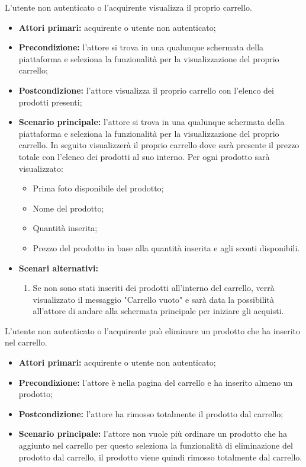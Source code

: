 L'utente non autenticato o l'acquirente visualizza il proprio carrello.
\begin{itemize}
    \item \textbf{Attori primari:} acquirente o utente non autenticato;
    \item \textbf{Precondizione:} l'attore si trova in una qualunque schermata della piattaforma e seleziona la funzionalità per la visualizzazione del proprio carrello;
    \item \textbf{Postcondizione:} l'attore visualizza il proprio carrello con l'elenco dei prodotti presenti;
    \item \textbf{Scenario principale:} l'attore si trova in una qualunque schermata della piattaforma e seleziona la funzionalità per la visualizzazione del proprio carrello. In seguito visualizzerà il proprio carrello dove sarà presente il prezzo totale con l'elenco dei prodotti al suo interno. Per ogni prodotto sarà visualizzato:
    \begin{itemize}
        \item Prima foto disponibile del prodotto;
        \item Nome del prodotto;
        \item Quantità inserita;
        \item Prezzo del prodotto in base alla quantità inserita e agli sconti disponibili.
    \end{itemize}
    \item \textbf{Scenari alternativi:} 
    \begin{enumerate}[label=\lett]
        \item Se non sono stati inseriti dei prodotti all'interno del carrello, verrà visualizzato il messaggio "Carrello vuoto" e sarà data la possibilità all'attore di andare alla schermata principale per iniziare gli acquisti.
    \end{enumerate}
\end{itemize}


L'utente non autenticato o l'acquirente può eliminare un prodotto che ha inserito nel carrello.
\begin{itemize}
    \item \textbf{Attori primari:} acquirente o utente non autenticato;
    \item \textbf{Precondizione:} l'attore è nella pagina del carrello e ha inserito almeno un prodotto;
    \item \textbf{Postcondizione:} l'attore ha rimosso totalmente il prodotto dal carrello;
    \item \textbf{Scenario principale:} l'attore non vuole più ordinare un prodotto che ha aggiunto nel carrello per questo seleziona la funzionalità di eliminazione del prodotto dal carrello, il prodotto viene quindi rimosso totalmente dal carrello.
\end{itemize}

